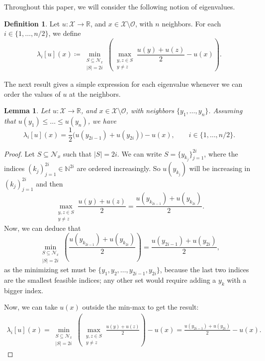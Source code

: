 \documentclass[reqno,11pt]{amsart}
\numberwithin{equation}{section}
\newtheorem{lemma}[theorem]{Lemma}
\theoremstyle{definition}
\newtheorem{definition}[theorem]{Definition}
\theoremstyle{remark}
\begin{document}
Throughout this paper, we will consider the following notion of eigenvalues.

\begin{definition}
Let $u \colon \mathcal{X}\rightarrow\mathbb{R}$, and \(x\in\mathcal X\setminus\mathcal O\), with $n$ neighbors. For each $i \in \{1,\dots, n/2\}$, we define
\[
    \lambda_i[u](x)\coloneqq \min_{\substack{S\subseteq \mathcal{N}_x\\ |S|=2i}} \left( \max_{\substack{y,z\in S\\ y\ne z}} \frac{u(y)+u(z)}{2} - u(x) \right).
\]
\end{definition}

The next result gives a simple expression for each eigenvalue whenever we can order the values of $u$ at the neighbors.

\begin{lemma}\label{lemma:eigen-expression}
Let $u \colon \mathcal{X}\rightarrow\mathbb{R}$, and \(x\in\mathcal X\setminus\mathcal O\), with neighbors $\{y_1,\dots,y_n\}$. Assuming that $u(y_1) \leq \dots \leq u(y_n)$, we have
\[
    \lambda_i[u](x) = \frac{1}{2}\bigl(u(y_{2i-1})+u(y_{2i})\bigr)-u(x),\qquad i \in \{1,\dots,n/2\}.
\]
\end{lemma}

\begin{proof}
Let $S\subseteq \mathcal{N}_x$ such that $|S|=2i$. We can write $S = \{y_{k_j}\}_{j=1}^{2i}$, where the indices $(k_j)_{j=1}^{2i}\in\mathbb{N}^{2i}$ are ordered increasingly. So $u(y_{k_j})$ will be increasing in $(k_j)_{j=1}^{2i}$ and then
\[
\max_{\substack{y,z\in S\\ y\ne z}} \frac{u(y)+u(z)}{2} = \frac{u(y_{k_{2i-1}})+u(y_{k_{2i}})}{2}.
\]
Now, we can deduce that
\[
\min_{\substack{S\subseteq \mathcal{N}_x\\ |S|=2i}} \left(\frac{u(y_{k_{2i-1}})+u(y_{k_{2i}})}{2} \right) =\frac{u(y_{2i-1})+u(y_{2i})}{2},
\]
as the minimizing set must be $\{y_1,y_2,\dots,y_{2i-1},y_{2i}\}$, because the last two indices are the smallest feasible indices; any other set would require adding a $y_k$ with a bigger index.

Now, we can take $u(x)$ outside the min-max to get the result:
\[
\begin{aligned}
    \lambda_i[u](x)= \min_{\substack{S\subseteq \mathcal{N}_x\\ |S|=2i}} \left( \max_{\substack{y,z\in S\\ y\ne z}} \frac{u(y)+u(z)}{2} \right) - u(x)=\frac{u(y_{2i-1})+u(y_{2i})}{2}- u(x).
\end{aligned}
\]
\end{proof}
\end{document}
